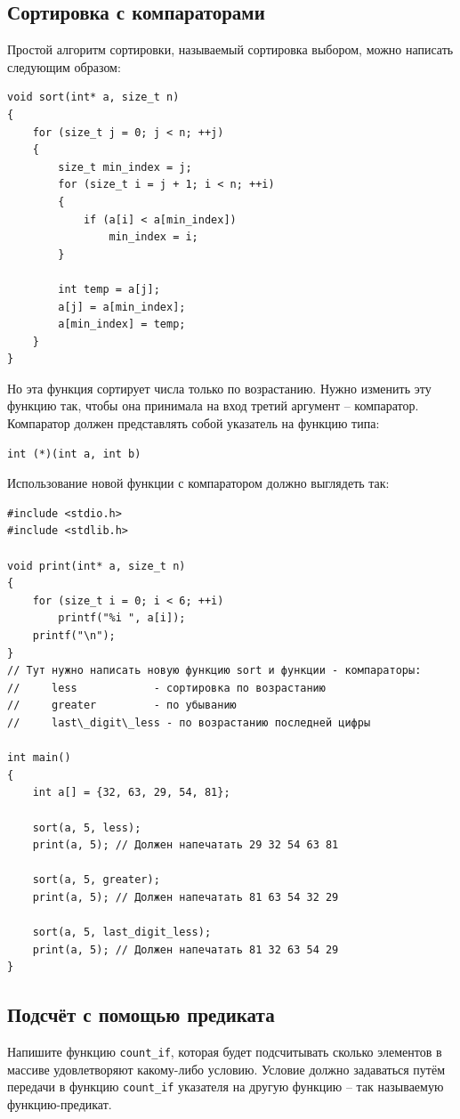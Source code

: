 \documentclass[10pt]{article}
\begin{document}
\subsection{Сортировка с компараторами}
Простой алгоритм сортировки, называемый сортировка выбором, можно написать следующим образом:
\begin{lstlisting}
void sort(int* a, size_t n)
{
    for (size_t j = 0; j < n; ++j)
    {
        size_t min_index = j;
        for (size_t i = j + 1; i < n; ++i)
        {
            if (a[i] < a[min_index])
                min_index = i;
        }

        int temp = a[j];
        a[j] = a[min_index];
        a[min_index] = temp;
    }
}
\end{lstlisting}
Но эта функция сортирует числа только по возрастанию. Нужно изменить эту функцию так, чтобы она принимала на вход третий аргумент -- компаратор. Компаратор должен представлять собой указатель на функцию типа:
\begin{lstlisting}
int (*)(int a, int b)
\end{lstlisting}
Использование новой функции с компаратором должно выглядеть так:
\begin{lstlisting}
#include <stdio.h>
#include <stdlib.h>

void print(int* a, size_t n)
{
    for (size_t i = 0; i < 6; ++i)
        printf("%i ", a[i]);
    printf("\n");
}
// Тут нужно написать новую функцию sort и функции - компараторы: 
//     less            - сортировка по возрастанию
//     greater         - по убыванию
//     last\_digit\_less - по возрастанию последней цифры

int main()
{
    int a[] = {32, 63, 29, 54, 81};
    
    sort(a, 5, less);
    print(a, 5); // Должен напечатать 29 32 54 63 81 
        
    sort(a, 5, greater);
    print(a, 5); // Должен напечатать 81 63 54 32 29
    
    sort(a, 5, last_digit_less);
    print(a, 5); // Должен напечатать 81 32 63 54 29
}
\end{lstlisting}


\subsection{Подсчёт с помощью предиката}
Напишите функцию \texttt{count\_if}, которая будет подсчитывать сколько элементов в массиве удовлетворяют какому-либо условию. Условие должно задаваться путём передачи в функцию \texttt{count\_if} указателя на другую функцию -- так называемую функцию-предикат.
\end{document}
